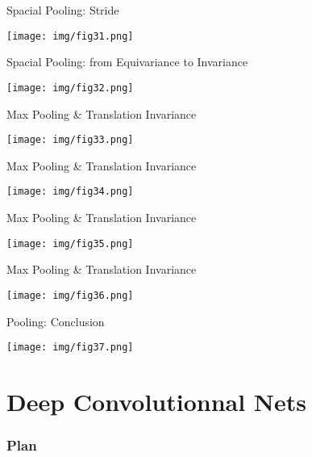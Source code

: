 \documentclass[9pt]{beamer}
\begin{document}
\begin{frame}{Spacial Pooling: Stride}
\begin{center}
	\texttt{[image: img/fig31.png]} 
\end{center}
\end{frame}

\begin{frame}{Spacial Pooling: from Equivariance to Invariance}
\begin{center}
	\texttt{[image: img/fig32.png]} 
\end{center}
\end{frame}
	
\begin{frame}{Max Pooling \& Translation Invariance}
\begin{center}
	\texttt{[image: img/fig33.png]} 
\end{center}
\end{frame}

\begin{frame}{Max Pooling \& Translation Invariance}
\begin{center}
	\texttt{[image: img/fig34.png]} 
\end{center}
\end{frame}

\begin{frame}{Max Pooling \& Translation Invariance}
\begin{center}
	\texttt{[image: img/fig35.png]} 
\end{center}
\end{frame}

\begin{frame}{Max Pooling \& Translation Invariance}
\begin{center}
	\texttt{[image: img/fig36.png]} 
\end{center}
\end{frame}

\begin{frame}{Pooling: Conclusion}
\begin{center}
	\texttt{[image: img/fig37.png]} 
\end{center}
\end{frame}

\section{Deep Convolutionnal Nets}

    \begin{frame}
   	 	\frametitle{Plan}
    		\tableofcontents[currentsection]
	\end{frame}		
	
\end{document}
